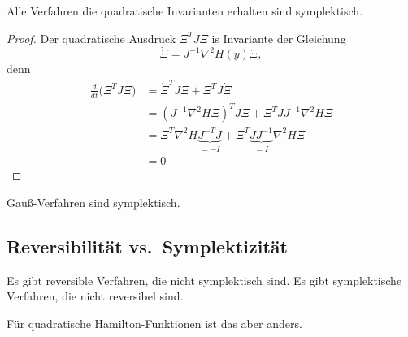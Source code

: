 \begin{satz}
	Alle Verfahren die quadratische Invarianten erhalten sind symplektisch.
\end{satz}
\begin{proof}
	Der quadratische Ausdruck $\Xi^T J\Xi$ is Invariante der Gleichung
	\begin{equation*}
		\dot \Xi = J^{-1}\nabla^2 H(y)\Xi,
	\end{equation*}
	denn
	\begin{align*}
		\frac{d}{dt}\Big(\Xi^T J\Xi\Big) & = \dot \Xi^T J\Xi + \Xi^T J\dot\Xi \\
		& = (J^{-1}\nabla^2 H\Xi)^T J\Xi + \Xi^T JJ^{-1}\nabla^2 H \Xi \\
		& = \Xi^T \nabla^2 H \underbrace{J^{-T}J}_{=-I} + \Xi^T\underbrace{ JJ^{-1}}_{=I} \nabla^2 H \Xi \\
		& = 0
	\end{align*}
\end{proof}

\begin{kor}
	Gauß-Verfahren sind symplektisch.
\end{kor}

\subsection{Reversibilität vs.\ Symplektizität}

Es gibt reversible Verfahren, die nicht symplektisch sind.
Es gibt symplektische Verfahren, die nicht reversibel sind.

Für quadratische Hamilton-Funktionen ist das aber anders.


